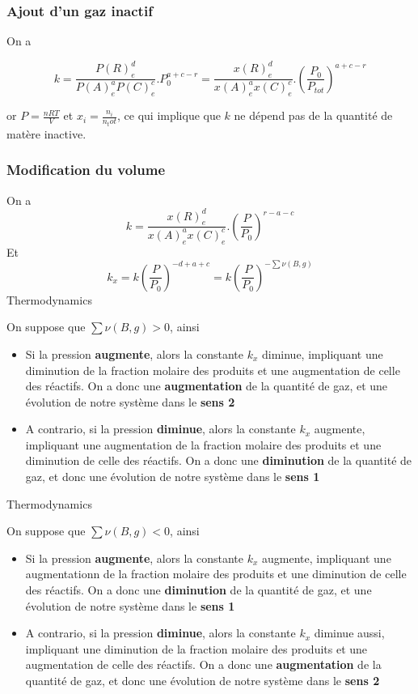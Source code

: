 \subsubsection{Ajout d'un gaz inactif}
On a 

$$k=\frac{P(R)_e^d}{P(A)_e^aP(C)_e^c}.P_0^{a+c-r} = \frac{x(R)_e^d}{x(A)_e^ax(C)_e^c}.\left (\frac{P_0}{P_{tot}}\right )^{a+c-r}$$

or $P=\frac{nRT}{V}$ et $x_i=\frac{n_i}{n_tot}$, ce qui implique que $k$ ne dépend pas de la quantité de matère inactive.

\subsubsection{Modification du volume}
On a 
$$k = \frac{x(R)_e^d}{x(A)_e^ax(C)_e^c}.\left (\frac{P}{P_{0}}\right )^{r-a-c}$$
Et
$$k_x=k \left ( \frac{P}{P_0}\right )^{-d+a+c}=k\left ( \frac{P}{P_0}\right )^{-\sum \nu(B,g)}$$
{\color{white}Thermodynamics}\\
\begin{proposition}
On suppose que $\sum \nu(B,g) >0$, ainsi \\
\begin{itemize}
\item Si la pression \textbf{augmente}, alors la constante $k_x$ diminue, impliquant une diminution de la fraction molaire des produits et une augmentation de celle des réactifs. On a donc une \textbf{augmentation} de la quantité de gaz, et une évolution de notre système dans le \textbf{sens 2}
\item A contrario, si la pression \textbf{diminue}, alors la constante $k_x$ augmente, impliquant une augmentation de la fraction molaire des produits et une diminution de celle des réactifs. On a donc une \textbf{diminution} de la quantité de gaz, et donc une évolution de notre système dans le \textbf{sens 1}
\end{itemize}
\end{proposition}

{\color{white}Thermodynamics}\\
\begin{proposition}
On suppose que $\sum \nu(B,g) <0$, ainsi \\
\begin{itemize}
\item Si la pression \textbf{augmente}, alors la constante $k_x$ augmente, impliquant une augmentationn de la fraction molaire des produits et une diminution de celle des réactifs. On a donc une \textbf{diminution} de la quantité de gaz, et une évolution de notre système dans le \textbf{sens 1}
\item A contrario, si la pression \textbf{diminue}, alors la constante $k_x$ diminue aussi, impliquant une diminution de la fraction molaire des produits et une augmentation de celle des réactifs. On a donc une \textbf{augmentation} de la quantité de gaz, et donc une évolution de notre système dans le \textbf{sens 2}
\end{itemize}
\end{proposition}

